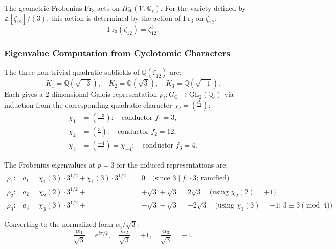 The geometric Frobenius $\mathrm{Fr}_3$ acts on $H^1_{\text{\'et}}(\mathcal{V},\mathbb{Q}_\ell)$.
For the variety defined by $\mathbb{Z}[\zeta_{12}]/(3)$, this action is
determined by the action of $\mathrm{Fr}_3$ on $\zeta_{12}$:
\begin{equation}
  \mathrm{Fr}_3(\zeta_{12}) = \zeta_{12}^3.
\end{equation}

\subsubsection{Eigenvalue Computation from Cyclotomic Characters}

The three non-trivial quadratic subfields of $\mathbb{Q}(\zeta_{12})$ are:
\begin{equation}
  K_1 = \mathbb{Q}(\sqrt{-3}),\quad K_2=\mathbb{Q}(\sqrt{3}),\quad K_3=\mathbb{Q}(\sqrt{-1}).
\end{equation}
Each gives a 2-dimensional Galois representation $\rho_i: G_\mathbb{Q}\to\mathrm{GL}_2(\mathbb{Q}_\ell)$
via induction from the corresponding quadratic character $\chi_i=\left(\frac{d_i}{\cdot}\right)$:
\begin{align}
  \chi_1 &= \left(\frac{-3}{\cdot}\right): \quad \text{conductor } f_1=3,\\
  \chi_2 &= \left(\frac{3}{\cdot}\right): \quad \text{conductor } f_2=12,\\
  \chi_3 &= \left(\frac{-4}{\cdot}\right)=\chi_{-4}: \quad \text{conductor } f_3=4.
\end{align}

The Frobenius eigenvalues at $p=3$ for the induced representations are:
\begin{equation}
\begin{array}{lcl}
\rho_1: & a_1 = \chi_1(3)\cdot 3^{1/2}+\overline{\chi_1(3)\cdot3^{1/2}} & = 0
  \quad\text{(since }3\mid f_1\cdot 3\text{; ramified)}\\
\rho_2: & a_2 = \chi_2(2)\cdot 3^{1/2}+\bar{} & = +\sqrt{3}+\sqrt{3} = 2\sqrt{3}
  \quad\text{(using }\chi_2(2)=+1\text{)}\\
\rho_3: & a_3 = \chi_3(3)\cdot 3^{1/2}+\bar{} & = -\sqrt{3}-\sqrt{3} = -2\sqrt{3}
  \quad\text{(using }\chi_3(3)=-1\text{; }3\equiv 3\pmod 4\text{)}
\end{array}
\label{eq:frob_eigenvalues}
\end{equation}

Converting to the normalized form $\alpha_i/\sqrt{3}$:
\begin{equation}
  \frac{\alpha_1}{\sqrt{3}} = e^{i\pi/2},\quad
  \frac{\alpha_2}{\sqrt{3}} = +1,\quad
  \frac{\alpha_3}{\sqrt{3}} = -1.
  \label{eq:normalized_frob}
\end{equation}

